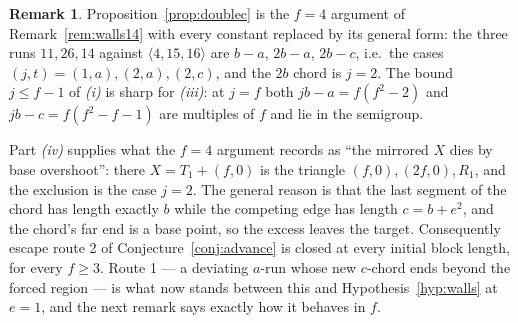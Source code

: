 \documentclass[11pt,reqno]{amsart}
\theoremstyle{plain}
\theoremstyle{definition}
\newtheorem{remark}[theorem]{Remark}
\begin{document}
\begin{remark}\label{rem:doublecscope}
Proposition~\ref{prop:doublec} is the $f=4$ argument of Remark~\ref{rem:walls14} with every constant
replaced by its general form: the three runs $11,26,14$ against $\langle4,15,16\rangle$ are
$b-a$, $2b-a$, $2b-c$, i.e.\ the cases $(j,t)=(1,a),(2,a),(2,c)$, and the $2b$ chord is $j=2$. The
bound $j\le f-1$ of \emph{(i)} is sharp for \emph{(iii)}: at $j=f$ both $jb-a=f(f^2-2)$ and
$jb-c=f(f^2-f-1)$ are multiples of $f$ and lie in the semigroup.

Part \emph{(iv)} supplies what the $f=4$ argument records as ``the mirrored $X$ dies by base
overshoot'': there $X=T_1+(f,0)$ is the triangle $(f,0),(2f,0),R_1$, and the exclusion is the case
$j=2$. The general reason is that the last segment of the chord has length exactly $b$ while the
competing edge has length $c=b+e^2$, and the chord's far end is a base point, so the excess leaves
the target. Consequently escape route 2 of Conjecture~\ref{conj:advance} is closed at every initial
block length, for every $f\ge3$. Route 1 --- a deviating $a$-run whose new $c$-chord ends beyond the
forced region --- is what now stands between this and Hypothesis~\ref{hyp:walls} at $e=1$, and the
next remark says exactly how it behaves in $f$.
\end{remark}
\end{document}

